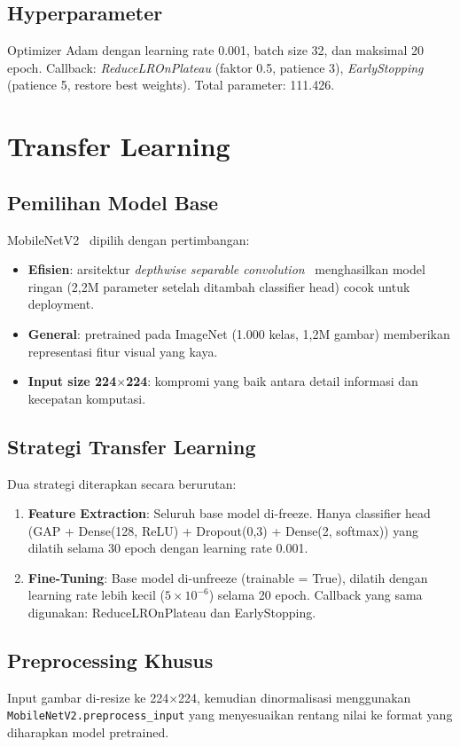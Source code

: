 \documentclass[conference]{IEEEtran}
\begin{document}
\subsection{Hyperparameter}
Optimizer Adam dengan learning rate 0.001, batch size 32, dan maksimal 20 epoch. Callback: \textit{ReduceLROnPlateau} (faktor 0.5, patience 3), \textit{EarlyStopping} (patience 5, restore best weights). Total parameter: 111.426.

\section{Transfer Learning}
\subsection{Pemilihan Model Base}
MobileNetV2~\cite{mobilenetv2} dipilih dengan pertimbangan:
\begin{itemize}
\item \textbf{Efisien}: arsitektur \textit{depthwise separable convolution}~\cite{chollet2017} menghasilkan model ringan (2,2M parameter setelah ditambah classifier head) cocok untuk deployment.
\item \textbf{General}: pretrained pada ImageNet (1.000 kelas, 1,2M gambar) memberikan representasi fitur visual yang kaya.
\item \textbf{Input size 224$\times$224}: kompromi yang baik antara detail informasi dan kecepatan komputasi.
\end{itemize}

\subsection{Strategi Transfer Learning}
Dua strategi diterapkan secara berurutan:
\begin{enumerate}
\item \textbf{Feature Extraction}: Seluruh base model di-freeze. Hanya classifier head (GAP + Dense(128, ReLU) + Dropout(0,3) + Dense(2, softmax)) yang dilatih selama 30 epoch dengan learning rate 0.001.
\item \textbf{Fine-Tuning}: Base model di-unfreeze (trainable = True), dilatih dengan learning rate lebih kecil ($5\times 10^{-6}$) selama 20 epoch. Callback yang sama digunakan: ReduceLROnPlateau dan EarlyStopping.
\end{enumerate}

\subsection{Preprocessing Khusus}
Input gambar di-resize ke 224$\times$224, kemudian dinormalisasi menggunakan \texttt{MobileNetV2.preprocess\_input} yang menyesuaikan rentang nilai ke format yang diharapkan model pretrained.
\end{document}
